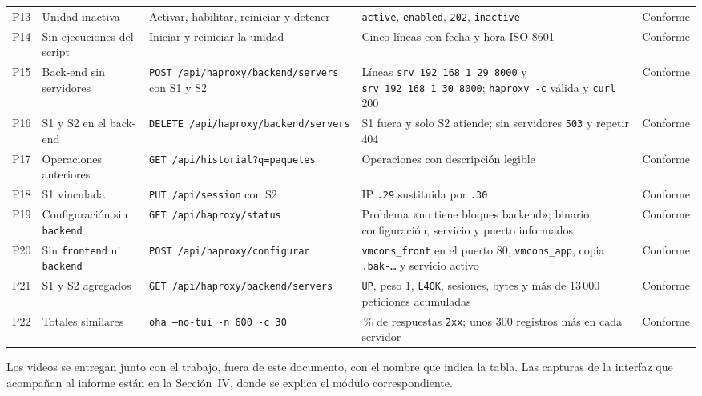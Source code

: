 \begin{table}[!t]
\begin{tabularx}{\textwidth}{@{}l >{\hsize=0.8\hsize}X >{\hsize=0.9\hsize}X >{\hsize=1.3\hsize}X c@{}}
    P13 & Unidad inactiva & Activar, habilitar, reiniciar y detener & \texttt{active}, \texttt{enabled}, \texttt{202}, \texttt{inactive} & Conforme \\
    P14 & Sin ejecuciones del script & Iniciar y reiniciar la unidad & Cinco líneas con fecha y hora ISO-8601 & Conforme \\
    P15 & Back-end sin servidores & \texttt{POST /api/\allowbreak haproxy/\allowbreak backend/\allowbreak servers} con S1 y S2 & Líneas \texttt{srv\_192\_168\_1\_29\_8000} y \texttt{srv\_192\_168\_1\_30\_8000}; \texttt{haproxy -c} válida y \texttt{curl} 200 & Conforme \\
    P16 & S1 y S2 en el back-end & \texttt{DELETE /api/\allowbreak haproxy/\allowbreak backend/\allowbreak servers} & S1 fuera y solo S2 atiende; sin servidores \texttt{503} y repetir 404 & Conforme \\
    P17 & Operaciones anteriores & \texttt{GET /api/historial?q=paquetes} & Operaciones con descripción legible & Conforme \\
    P18 & S1 vinculada & \texttt{PUT /api/session} con S2 & IP \texttt{.29} sustituida por \texttt{.30} & Conforme \\
    P19 & Configuración sin \texttt{backend} & \texttt{GET /api/haproxy/status} & Problema «no tiene bloques backend»; binario, configuración, servicio y puerto informados & Conforme \\
    P20 & Sin \texttt{frontend} ni \texttt{backend} & \texttt{POST /api/haproxy/configurar} & \texttt{vmcons\_front} en el puerto 80, \texttt{vmcons\_app}, copia \texttt{.bak-\dots} y servicio activo & Conforme \\
    P21 & S1 y S2 agregados & \texttt{GET /api/\allowbreak haproxy/\allowbreak backend/\allowbreak servers} & \texttt{UP}, peso 1, \texttt{L4OK}, sesiones, bytes y más de 13\,000 peticiones acumuladas & Conforme \\
    P22 & Totales similares & \texttt{oha --no-tui -n 600 -c 30} & 100\,\% de respuestas \texttt{2xx}; unos 300 registros más en cada servidor & Conforme \\
    \hline
  \end{tabularx}
\end{table}

Los videos se entregan junto con el trabajo, fuera de este documento,
con el nombre que indica la tabla. Las capturas de la interfaz que
acompañan al informe están en la Sección~IV, donde se explica el módulo
correspondiente.

